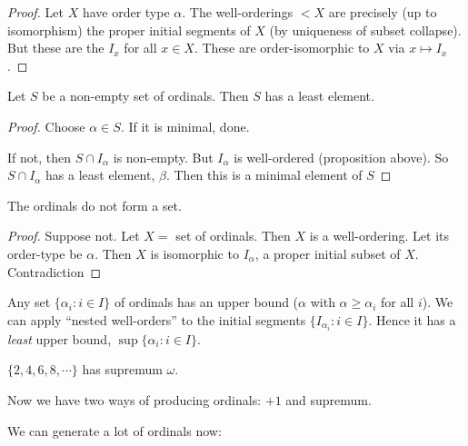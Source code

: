 \documentclass[a4paper]{article}
\begin{document}
\begin{proof}
  Let $X$ have order type $\alpha$. The well-orderings $< X$ are precisely (up to isomorphism) the proper initial segments of $X$ (by uniqueness of subset collapse). But these are the $I_x$ for all $x\in X$. These are order-isomorphic to $X$ via $x\mapsto I_x$.
\end{proof}

\begin{prop}
  Let $S$ be a non-empty set of ordinals. Then $S$ has a least element.
\end{prop}

\begin{proof}
  Choose $\alpha\in S$. If it is minimal, done.

  If not, then $S\cap I_\alpha$ is non-empty. But $I_\alpha$ is well-ordered (proposition above). So $S\cap I_\alpha$ has a least element, $\beta$. Then this is a minimal element of $S$
\end{proof}

\begin{thm}
  The ordinals do not form a set.
\end{thm}

\begin{proof}
  Suppose not. Let $X =$ set of ordinals. Then $X$ is a well-ordering. Let its order-type be $\alpha$. Then $X$ is isomorphic to $I_\alpha$, a proper initial subset of $X$. Contradiction
\end{proof}
\note Any set $\{\alpha_i: i\in I\}$ of ordinals has an upper bound ($\alpha$ with $\alpha \geq \alpha_i$ for all $i$). We can apply ``nested well-orders'' to the initial segments $\{I_{\alpha_i}: i\in I\}$. Hence it has a \emph{least} upper bound, $\sup\{\alpha_i: i\in I\}$.

\begin{eg}
  $\{2, 4, 6, 8, \cdots\}$ has supremum $\omega$.
\end{eg}

Now we have two ways of producing ordinals: $+1$ and supremum.

We can generate a lot of ordinals now:
\end{document}
